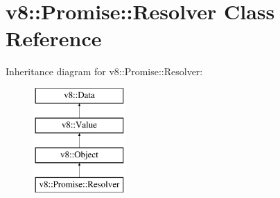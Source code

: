 \hypertarget{classv8_1_1Promise_1_1Resolver}{}\section{v8\+:\+:Promise\+:\+:Resolver Class Reference}
\label{classv8_1_1Promise_1_1Resolver}
Inheritance diagram for v8\+:\+:Promise\+:\+:Resolver\+:\begin{figure}[H]
\begin{center}
\leavevmode
\includegraphics[height=4.000000cm]{classv8_1_1Promise_1_1Resolver}
\end{center}
\end{figure}
